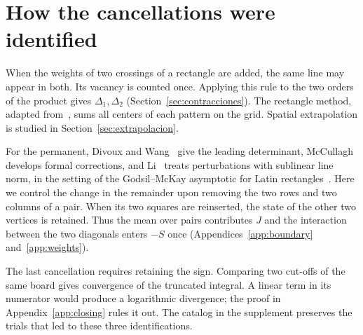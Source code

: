\section{How the cancellations were identified}\label{sec:cancelaciones}
When the weights of two crossings of a rectangle are added, the same line may appear in both. Its vacancy
is counted once. Applying this rule to the two orders of the product gives \(\Delta_1,\Delta_2\)
(Section~\ref{sec:contracciones}). The rectangle method, adapted from~\cite[\S4]{tc}, sums all centers of
each pattern on the grid. Spatial extrapolation is studied in Section~\ref{sec:extrapolacion}.

For the permanent, Divoux and Wang~\cite{dw} give the leading determinant, McCullagh~\cite{mcc} develops
formal corrections, and Li~\cite{li} treats perturbations with sublinear line norm, in the
setting of the Godsil--McKay asymptotic for Latin rectangles~\cite{gm}. Here we
control the change in the remainder upon removing the two rows and two columns of a pair. When its two
squares are reinserted, the state of the other two vertices is retained. Thus the mean over pairs
contributes \(J\) and the interaction between the two diagonals enters \(-S\) once
(Appendices~\ref{app:boundary} and~\ref{app:weights}).

The last cancellation requires retaining the sign. Comparing two cut-offs of the same board gives
convergence of the truncated integral. A linear term in its numerator would produce a logarithmic
divergence; the proof in Appendix~\ref{app:closing} rules it out. The catalog in the supplement preserves
the trials that led to these three identifications.
